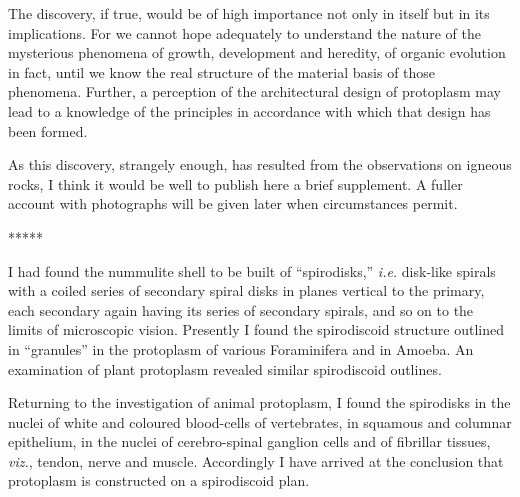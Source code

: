 \documentclass[a4paper, 12pt, oneside]{article}
\begin{document}
The discovery, if true, would be of high importance not only in itself but in its implications. For we cannot hope adequately to understand the nature of the mysterious phenomena of growth, development and heredity, of organic evolution in fact, until we know the real structure of the material basis of those phenomena. Further, a perception of the architectural design of protoplasm may lead to a knowledge of the principles in accordance with which that design has been formed.

As this discovery, strangely enough, has resulted from the observations on igneous rocks, I think it would be well to publish here a brief supplement. A fuller account with photographs will be given later when circumstances permit.

\centerline{*\hspace{15mm}*\hspace{15mm}*\hspace{15mm}*\hspace{15mm}*}
\bigskip

I had found the nummulite shell to be built of ``spirodisks,'' \emph{i.e.} disk-like spirals with a coiled series of secondary spiral disks in planes vertical to the primary, each secondary again having its series of secondary spirals, and so on to the limits of microscopic vision. Presently I found the spirodiscoid structure outlined in ``granules'' in the protoplasm of various Foraminifera and in Amoeba. An examination of plant protoplasm revealed similar spirodiscoid outlines.

Returning to the investigation of animal protoplasm, I found the spirodisks in the nuclei of white and coloured blood-cells of vertebrates, in squamous and columnar epithelium, in the nuclei of cerebro-spinal ganglion cells and of fibrillar tissues, \emph{viz.}, tendon, nerve and muscle. Accordingly I have arrived at the conclusion that protoplasm is constructed on a spirodiscoid plan.
\end{document}
